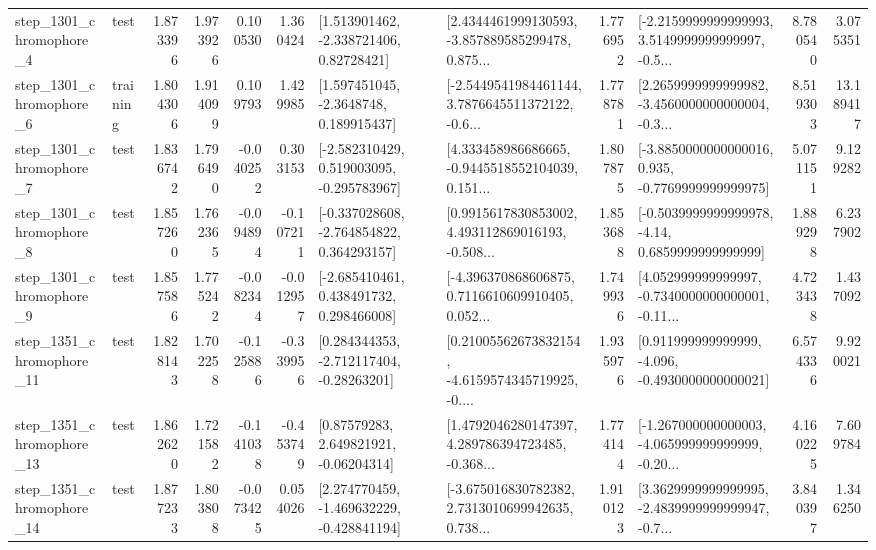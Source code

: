 \begin{tabular}{llrrrrllrlrr}
  step\_1301\_chromophore\_4 &      test &      1.873396 &    1.973926 &      0.100530 &  1.360424 &     [1.513901462, -2.338721406, 0.82728421] &  [2.4344461999130593, -3.857889585299478, 0.875... &       1.776952 &  [-2.2159999999999993, 3.5149999999999997, -0.5... &            8.780540 &          3.075351 \\
  step\_1301\_chromophore\_6 &  training &      1.804306 &    1.914099 &      0.109793 &  1.429985 &      [1.597451045, -2.3648748, 0.189915437] &  [-2.5449541984461144, 3.7876645511372122, -0.6... &       1.778781 &  [2.2659999999999982, -3.4560000000000004, -0.3... &            8.519303 &         13.189417 \\
  step\_1301\_chromophore\_7 &      test &      1.836742 &    1.796490 &     -0.040252 &  0.303153 &   [-2.582310429, 0.519003095, -0.295783967] &  [4.333458986686665, -0.9445518552104039, 0.151... &       1.807875 &  [-3.8850000000000016, 0.935, -0.7769999999999975] &            5.071151 &          9.129282 \\
  step\_1301\_chromophore\_8 &      test &      1.857260 &    1.762365 &     -0.094894 & -0.107211 &   [-0.337028608, -2.764854822, 0.364293157] &  [0.9915617830853002, 4.493112869016193, -0.508... &       1.853688 &   [-0.5039999999999978, -4.14, 0.6859999999999999] &            1.889298 &          6.237902 \\
  step\_1301\_chromophore\_9 &      test &      1.857586 &    1.775242 &     -0.082344 & -0.012957 &    [-2.685410461, 0.438491732, 0.298466008] &  [-4.396370868606875, 0.7116610609910405, 0.052... &       1.749936 &  [4.052999999999997, -0.7340000000000001, -0.11... &            4.723438 &          1.437092 \\
 step\_1351\_chromophore\_11 &      test &      1.828143 &    1.702258 &     -0.125886 & -0.339956 &    [0.284344353, -2.712117404, -0.28263201] &  [0.21005562673832154, -4.6159574345719925, -0.... &       1.935976 &   [0.911999999999999, -4.096, -0.4930000000000021] &            6.574336 &          9.920021 \\
 step\_1351\_chromophore\_13 &      test &      1.862620 &    1.721582 &     -0.141038 & -0.453749 &      [0.87579283, 2.649821921, -0.06204314] &  [1.4792046280147397, 4.289786394723485, -0.368... &       1.774144 &  [-1.267000000000003, -4.065999999999999, -0.20... &            4.160225 &          7.609784 \\
 step\_1351\_chromophore\_14 &      test &      1.877233 &    1.803808 &     -0.073425 &  0.054026 &   [2.274770459, -1.469632229, -0.428841194] &  [-3.675016830782382, 2.7313010699942635, 0.738... &       1.910123 &  [3.3629999999999995, -2.4839999999999947, -0.7... &            3.840397 &          1.346250 \\

\end{tabular}
